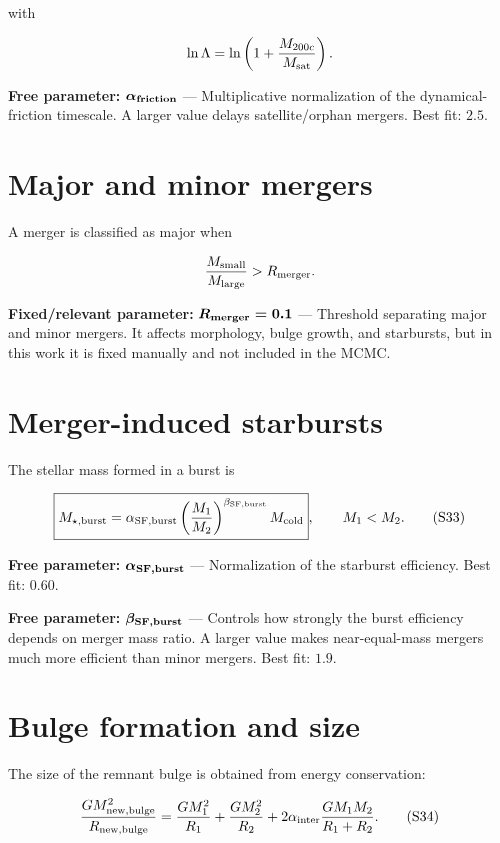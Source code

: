 \documentclass[11pt,a4paper]{article}
\newcommand{\freeparam}[2]{%
  \colorbox{freeblue}{\parbox{0.95\linewidth}{\textbf{Free parameter:} $\boldsymbol{#1}$ --- #2}}%
}
\newcommand{\fixedparam}[2]{%
  \colorbox{fixedgray}{\parbox{0.95\linewidth}{\textbf{Fixed/relevant parameter:} $\boldsymbol{#1}$ --- #2}}%
}
\begin{document}
with

\begin{equation}
 \ln\Lambda=\ln\left(1+\frac{M_{200c}}{M_{\rm sat}}\right).
\end{equation}

\freeparam{\alpha_{\rm friction}}{Multiplicative normalization of the dynamical-friction timescale. A larger value delays satellite/orphan mergers. Best fit: $2.5$.}

\section{Major and minor mergers}
A merger is classified as major when

\begin{equation}
 \frac{M_{\rm small}}{M_{\rm large}}>R_{\rm merger}.
\end{equation}

\fixedparam{R_{\rm merger}=0.1}{Threshold separating major and minor mergers. It affects morphology, bulge growth, and starbursts, but in this work it is fixed manually and not included in the MCMC.}

\section{Merger-induced starbursts}
The stellar mass formed in a burst is

\begin{equation}
 \boxed{M_{\star,\rm burst}=\alpha_{\rm SF,burst}
 \left(\frac{M_1}{M_2}\right)^{\beta_{\rm SF,burst}}M_{\rm cold}},
 \qquad M_1<M_2.
 \tag{S33}
\end{equation}

\freeparam{\alpha_{\rm SF,burst}}{Normalization of the starburst efficiency. Best fit: $0.60$.}

\freeparam{\beta_{\rm SF,burst}}{Controls how strongly the burst efficiency depends on merger mass ratio. A larger value makes near-equal-mass mergers much more efficient than minor mergers. Best fit: $1.9$.}

\section{Bulge formation and size}
The size of the remnant bulge is obtained from energy conservation:

\begin{equation}
 \frac{GM_{\rm new,bulge}^2}{R_{\rm new,bulge}}
 =\frac{GM_1^2}{R_1}
 +\frac{GM_2^2}{R_2}
 +2\alpha_{\rm inter}\frac{GM_1M_2}{R_1+R_2}.
 \tag{S34}
\end{equation}
\end{document}
